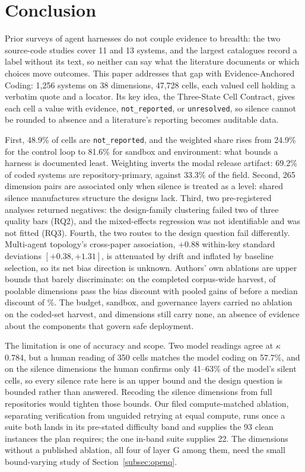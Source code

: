 \section{Conclusion}\label{sec:conclusion}

Prior surveys of agent harnesses do not couple evidence to breadth: the two source-code studies
cover 11 and 13 systems, and the largest catalogues record a label without its text, so neither can say what
the literature documents or which choices move outcomes. This paper addresses that
gap with Evidence-Anchored Coding: 1,256 systems on 38 dimensions, 47,728 cells, each valued cell holding
a verbatim quote and a locator. Its key idea, the Three-State Cell Contract, gives each cell a value with
evidence, \texttt{not\_reported}, or \texttt{unresolved}, so silence cannot be rounded to absence and a
literature's reporting becomes auditable data.

First, 48.9\% of cells are \texttt{not\_reported}, and the weighted share rises from 24.9\% for the
control loop to 81.6\% for sandbox and environment: what bounds a harness is documented least.
Weighting inverts the modal release artifact: 69.2\% of coded systems are repository-primary, against
33.3\% of the field. Second, 265 dimension pairs are associated only when
silence is treated as a level: shared silence manufactures structure the designs lack. Third,
two pre-registered analyses returned negatives: the design-family clustering failed two of three quality
bars (RQ2), and the mixed-effects regression was not identifiable and was not fitted (RQ3). Fourth, the two routes to the design
question fail differently. Multi-agent topology's cross-paper association, $+0.88$ within-key
standard deviations $[+0.38, +1.31]$, is attenuated by drift and inflated by baseline selection, so its net bias direction
is unknown. Authors' own ablations are upper bounds that barely discriminate: on the completed corpus-wide harvest, \rqDiscountSurviveZ{} of \rqPoolableDims{} poolable
dimensions pass the bias discount with pooled gains of \rqEffectRangeSurviving{} before a median
discount of \rqMedianDiscountPct\%. The budget, sandbox, and governance layers carried no ablation on the
coded-set harvest, and \rqZeroDimCount{} dimensions still carry none, an absence of evidence about the
components that govern safe deployment.

The limitation is one of accuracy and scope. Two model readings agree at $\kappa$ 0.784, but a human
reading of 350 cells matches the model coding on 57.7\%, and on the silence dimensions the human
confirms only 41--63\% of the model's silent cells, so every silence rate here is an upper bound and the
design question is bounded rather than answered. Recoding the silence dimensions from full
repositories would tighten those bounds. Our filed compute-matched ablation, separating verification from unguided
retrying at equal compute, runs once a suite both lands in its pre-stated difficulty band and
supplies the 93 clean instances the plan requires; the one in-band suite supplies 22. The
\rqZeroDimCount{} dimensions without a published ablation, all four of layer G among them, need the
small bound-varying study of Section~\ref{subsec:openq}.
